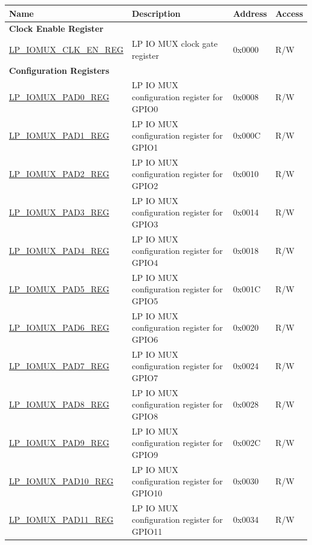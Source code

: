 \begin{longtable}{ | p{6cm} | p{7.2cm} | p{1.3cm} | p{1cm} | }
\hline\rowcolor{lightgray}
\textbf{Name} & \textbf{Description} &  \textbf{Address} & \textbf{Access} \\ \hline
\endhead
\multicolumn{4}{|l|}{\textbf{Clock Enable Register}} \\ \hline
\hyperref[regdesc:LPIOMUXCLKENREG]{LP\_IOMUX\_CLK\_EN\_REG} & LP IO MUX clock gate register & 0x0000 & R/W \\ \hline
\multicolumn{4}{|l|}{\textbf{Configuration Registers}} \\ \hline
\hyperref[regdesc:LPIOMUXPADNREG]{LP\_IOMUX\_PAD0\_REG} & LP IO MUX configuration register for GPIO0 & 0x0008 & R/W \\ \hline
\hyperref[regdesc:LPIOMUXPADNREG]{LP\_IOMUX\_PAD1\_REG} & LP IO MUX configuration register for GPIO1 & 0x000C & R/W \\ \hline
\hyperref[regdesc:LPIOMUXPADNREG]{LP\_IOMUX\_PAD2\_REG} & LP IO MUX configuration register for GPIO2 & 0x0010 & R/W \\ \hline
\hyperref[regdesc:LPIOMUXPADNREG]{LP\_IOMUX\_PAD3\_REG} & LP IO MUX configuration register for GPIO3 & 0x0014 & R/W \\ \hline
\hyperref[regdesc:LPIOMUXPADNREG]{LP\_IOMUX\_PAD4\_REG} & LP IO MUX configuration register for GPIO4 & 0x0018 & R/W \\ \hline
\hyperref[regdesc:LPIOMUXPADNREG]{LP\_IOMUX\_PAD5\_REG} & LP IO MUX configuration register for GPIO5 & 0x001C & R/W \\ \hline
\hyperref[regdesc:LPIOMUXPADNREG]{LP\_IOMUX\_PAD6\_REG} & LP IO MUX configuration register for GPIO6 & 0x0020 & R/W \\ \hline
\hyperref[regdesc:LPIOMUXPADNREG]{LP\_IOMUX\_PAD7\_REG} & LP IO MUX configuration register for GPIO7 & 0x0024 & R/W \\ \hline
\hyperref[regdesc:LPIOMUXPADNREG]{LP\_IOMUX\_PAD8\_REG} & LP IO MUX configuration register for GPIO8 & 0x0028 & R/W \\ \hline
\hyperref[regdesc:LPIOMUXPADNREG]{LP\_IOMUX\_PAD9\_REG} & LP IO MUX configuration register for GPIO9 & 0x002C & R/W \\ \hline
\hyperref[regdesc:LPIOMUXPADNREG]{LP\_IOMUX\_PAD10\_REG} & LP IO MUX configuration register for GPIO10 & 0x0030 & R/W \\ \hline
\hyperref[regdesc:LPIOMUXPADNREG]{LP\_IOMUX\_PAD11\_REG} & LP IO MUX configuration register for GPIO11 & 0x0034 & R/W \\ \hline

\end{longtable}
